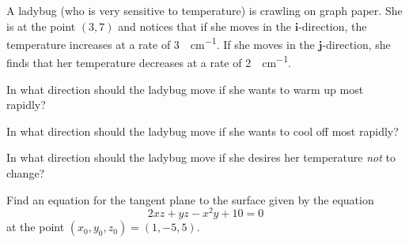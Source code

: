 \documentclass[boxes]{gsypset}
\begin{document}
	\begin{problem}[2.6.12]
		A ladybug (who is very sensitive to temperature) is crawling on graph paper. 
		She is at the point $(3, 7)$ and notices that if she moves in the $\mathbf{i}$-direction,
		the temperature increases at a rate of \SI{3}{\deg\per\cm}. 
		If she moves in the $\mathbf{j}$-direction, she finds that 
		her temperature decreases at a rate of \SI{2}{\deg\per\cm}. 
		\begin{subproblems}
			\subproblem In what direction should the ladybug move if she wants to warm up most rapidly?
				\begin{solution}
					
				\end{solution}
				
			\subproblem In what direction should the ladybug move if she wants to cool off most rapidly?
				\begin{solution}
					
				\end{solution}
				
			\subproblem In what direction should the ladybug move if 
				she desires her temperature \textit{not} to change?
				\begin{solution}
					
				\end{solution}
		\end{subproblems}
	\end{problem}
	
	\begin{problem}[2.6.18]
		 Find an equation for the tangent plane to the surface given by the equation 
		 \[2xz+yz-x^2y+10=0\]
		 at the point $(x_0, y_0, z_0) = (1,-5,5)$.
	\end{problem}
	\begin{solution}
		
	\end{solution}
\end{document}
